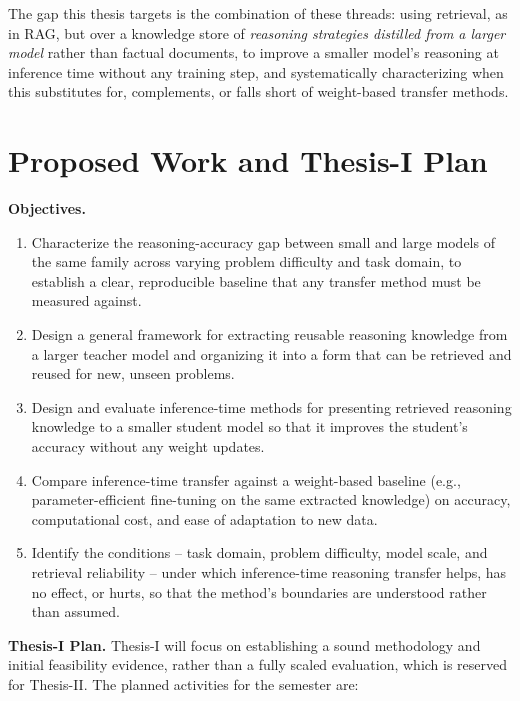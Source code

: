 \documentclass[a4, 12pt]{article}
\begin{document}
The gap this thesis targets is the combination of these threads: using retrieval, as in RAG, but over a knowledge store of \emph{reasoning strategies distilled from a larger model} rather than factual documents, to improve a smaller model's reasoning at inference time without any training step, and systematically characterizing when this substitutes for, complements, or falls short of weight-based transfer methods.

\section{Proposed Work and Thesis-I Plan}

\textbf{Objectives.}
\begin{enumerate}
    \item Characterize the reasoning-accuracy gap between small and large models of the same family across varying problem difficulty and task domain, to establish a clear, reproducible baseline that any transfer method must be measured against.
    \item Design a general framework for extracting reusable reasoning knowledge from a larger teacher model and organizing it into a form that can be retrieved and reused for new, unseen problems.
    \item Design and evaluate inference-time methods for presenting retrieved reasoning knowledge to a smaller student model so that it improves the student's accuracy without any weight updates.
    \item Compare inference-time transfer against a weight-based baseline (e.g., parameter-efficient fine-tuning on the same extracted knowledge) on accuracy, computational cost, and ease of adaptation to new data.
    \item Identify the conditions -- task domain, problem difficulty, model scale, and retrieval reliability -- under which inference-time reasoning transfer helps, has no effect, or hurts, so that the method's boundaries are understood rather than assumed.
\end{enumerate}

\textbf{Thesis-I Plan.} Thesis-I will focus on establishing a sound methodology and initial feasibility evidence, rather than a fully scaled evaluation, which is reserved for Thesis-II. The planned activities for the semester are:
\end{document}

